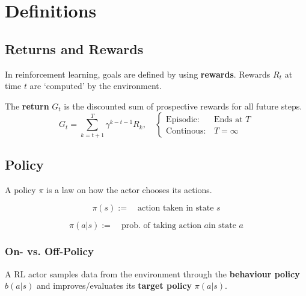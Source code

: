 \section{Definitions}
\begin{center}
\end{center}

\subsection{Returns and Rewards}
In reinforcement learning, goals are defined by using \textbf{rewards}. Rewards $R_t$ at time $t$ are `computed' by the environment.

The \textbf{return} $G_t$ is the discounted sum of prospective rewards for all future steps.
\noindent\begin{equation*}
    G_t = \sum_{k=t+1}^{T} \gamma^{k-t-1} R_{k},\quad \begin{cases}
        \mathrm{Episodic:}  & \text{Ends at }T \\
        \mathrm{Continous:} & T=\infty
    \end{cases}
\end{equation*}

\subsection{Policy}
A policy $\pi$ is a law on how the actor chooses its actions.

\noindent\begin{equation*}
    \pi(s):=\quad \text{action taken in state }s
\end{equation*}

\noindent\begin{equation*}
    \pi(a|s):=\quad \text{prob.\ of taking action }a \text{in state }a
\end{equation*}

\subsubsection{On- vs. Off-Policy}
A RL actor samples data from the environment through the \textbf{behaviour policy} $b(a|s)$ and improves/evaluates its \textbf{target policy} $\pi(a|s)$.

